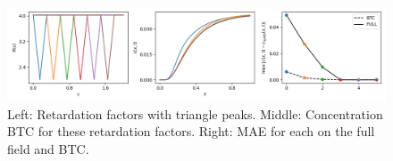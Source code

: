 \begin{figure}[h]
    \centering
    \includegraphics{figs/triangle_ret_pertubation.png}
    \caption{Left: Retardation factors with triangle peaks. Middle: Concentration BTC for these retardation factors. Right: MAE for each on the full field and BTC.}
    \label{fig:triangle_ret_pertubation}
\end{figure}